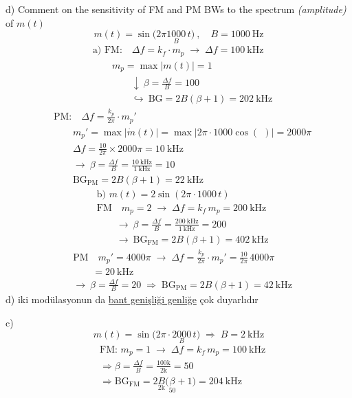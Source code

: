 \documentclass[11pt,a4paper]{article}
\begin{document}
d) Comment on the sensitivity of FM and PM BWs to the spectrum \textit{(amplitude)} of $m(t)$
\[ m(t)=\sin\big(2\pi\underset{B}{1000}\,t\big)\ ,\quad B=1000\ \mathrm{Hz} \]
\begin{align*}
&\text{a) FM:}\quad \Delta f=k_f\cdot m_p \;\to\; \Delta f=100\ \mathrm{kHz}\\
&\qquad m_p=\max|m(t)|=1\\
&\qquad\qquad\downarrow\ \beta=\frac{\Delta f}{B}=100\\
&\qquad\qquad\hookrightarrow\ \mathrm{BG}=2B(\beta+1)=202\ \mathrm{kHz}
\end{align*}
\begin{align*}
&\text{PM:}\quad \Delta f=\frac{k_p}{2\pi}\cdot m_p'\\
&\qquad m_p'=\max|\dot m(t)|=\max\big|2\pi\cdot1000\cos(\ \,)\big|=2000\pi\\
&\qquad \Delta f=\frac{10}{2\pi}\times2000\pi=10\ \mathrm{kHz}\\
&\qquad\to\ \beta=\frac{\Delta f}{B}=\frac{10\ \mathrm{kHz}}{1\ \mathrm{kHz}}=10\\
&\qquad \mathrm{BG}_{\mathrm{PM}}=2B(\beta+1)=22\ \mathrm{kHz}
\end{align*}
\begin{align*}
&\text{b) }m(t)=2\sin(2\pi\cdot1000\,t)\\
&\text{FM}\quad m_p=2\;\to\;\Delta f=k_f\,m_p=200\ \mathrm{kHz}\\
&\qquad\to\ \beta=\frac{\Delta f}{B}=\frac{200\ \mathrm{kHz}}{1\ \mathrm{kHz}}=200\\
&\qquad\to\ \mathrm{BG}_{\mathrm{FM}}=2B(\beta+1)=402\ \mathrm{kHz}
\end{align*}
\begin{align*}
&\text{PM}\quad m_p'=4000\pi\;\to\;\Delta f=\frac{k_p}{2\pi}\cdot m_p'=\frac{10}{2\pi}\,4000\pi\\
&\qquad=20\ \mathrm{kHz}\\
&\to\ \beta=\frac{\Delta f}{B}=20\;\Rightarrow\;\mathrm{BG}_{\mathrm{PM}}=2B(\beta+1)=42\ \mathrm{kHz}
\end{align*}
d) iki modülasyonun da \underline{bant genişliği genliğe} çok duyarlıdır

c)
\[ m(t)=\sin\big(2\pi\cdot\underset{B}{2000}\,t\big)\;\Rightarrow\;B=2\ \mathrm{kHz} \]
\begin{align*}
&\text{FM: }m_p=1\;\to\;\Delta f=k_f\,m_p=100\ \mathrm{kHz}\\
&\Rightarrow\beta=\frac{\Delta f}{B}=\frac{100\mathrm{k}}{2\mathrm{k}}=50\\
&\Rightarrow\mathrm{BG}_{\mathrm{FM}}=2\underset{2\mathrm{k}}{B}\big(\underset{50}{\beta}+1\big)=204\ \mathrm{kHz}
\end{align*}
\end{document}
